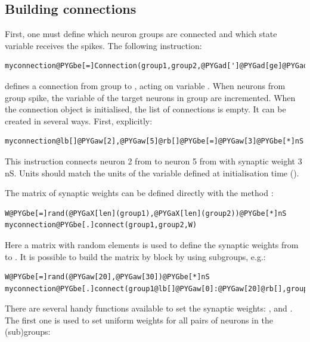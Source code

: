 \documentclass[letterpaper,10pt,english]{manual}
\begin{document}
\subsection{Building connections}

First, one must define which neuron groups are connected and which state variable receives the spikes.
The following instruction:

\begin{Verbatim}[commandchars=@\[\]]
myconnection@PYGbe[=]Connection(group1,group2,@PYGad[']@PYGad[ge]@PYGad['])
\end{Verbatim}

defines a connection from group  to , acting on variable . When
neurons from group  spike, the variable  of the target neurons in group
 are incremented. When the connection object is initialised, the list of connections
is empty. It can be created in several ways. First, explicitly:

\begin{Verbatim}[commandchars=@\[\]]
myconnection@lb[]@PYGaw[2],@PYGaw[5]@rb[]@PYGbe[=]@PYGaw[3]@PYGbe[*]nS
\end{Verbatim}

This instruction connects neuron 2 from  to neuron 5 from  with synaptic weight
3 nS. Units should match the units of the variable defined at initialisation time ().

The matrix of synaptic weights can be defined directly with the method :

\begin{Verbatim}[commandchars=@\[\]]
W@PYGbe[=]rand(@PYGaX[len](group1),@PYGaX[len](group2))@PYGbe[*]nS
myconnection@PYGbe[.]connect(group1,group2,W)
\end{Verbatim}

Here a matrix with random elements is used to define the synaptic weights from 
to . It is possible to build the matrix by block by using subgroups, e.g.:

\begin{Verbatim}[commandchars=@\[\]]
W@PYGbe[=]rand(@PYGaw[20],@PYGaw[30])@PYGbe[*]nS
myconnection@PYGbe[.]connect(group1@lb[]@PYGaw[0]:@PYGaw[20]@rb[],group2@lb[]@PYGaw[10]:@PYGaw[40]@rb[],W@PYGbe[=]W)
\end{Verbatim}

There are several handy functions available to set the synaptic weights:
,  and
. The first one
is used to set uniform weights for all pairs of neurons in the (sub)groups:
\end{document}
